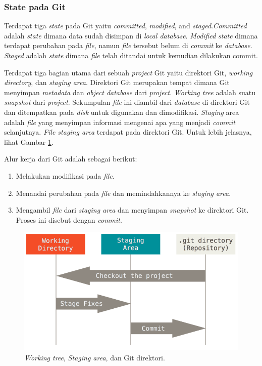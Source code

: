 \subsubsection{State pada Git}
Terdapat tiga \textit{state} pada Git yaitu \textit{committed}, \textit{modified}, and \textit{staged}.\textit{Committed} adalah \textit{state} dimana data sudah disimpan di \textit{local database}. \textit{Modified} \textit{state} dimana terdapat perubahan pada \textit{file}, namun \textit{file} tersebut belum di \textit{commit} ke \textit{database}. \textit{Staged} adalah \textit{state} dimana \textit{file} telah ditandai untuk kemudian dilakukan commit.

Terdapat tiga bagian utama dari sebuah \textit{project} Git yaitu direktori Git, \textit{working directory}, dan \textit{staging area}. Direktori Git merupakan tempat dimana Git menyimpan \textit{metadata} dan \textit{object database} dari \textit{project}. \textit{Working tree} adalah suatu \textit{snapshot} dari \textit{project}. Sekumpulan \textit{file} ini diambil dari \textit{database} di direktori Git dan ditempatkan pada \textit{disk} untuk digunakan dan dimodifikasi. \textit{Staging} area adalah \textit{file} yang menyimpan informasi mengenai apa yang menjadi \textit{commit} selanjutnya. \textit{File staging area} terdapat pada direktori Git. Untuk lebih jelasnya, lihat Gambar \ref{fig:git_state}.

Alur kerja dari Git adalah sebagai berikut:
\begin{enumerate}
\item Melakukan modifikasi pada \textit{file}.
\item Menandai perubahan pada \textit{file} dan memindahkannya ke \textit{staging area}.
\item Mengambil \textit{file} dari \textit{staging area} dan menyimpan \textit{snapshot} ke direktori Git. Proses ini disebut dengan \textit{commit}.
\end{enumerate}  

\begin{figure}[H]
	\centering
		\includegraphics[scale=0.5]{Gambar/git_state.png}
	\caption{ \textit{Working tree}, \textit{Staging area}, dan Git direktori\cite{chacon2014pro}.}
	\label{fig:git_state}
\end{figure}

